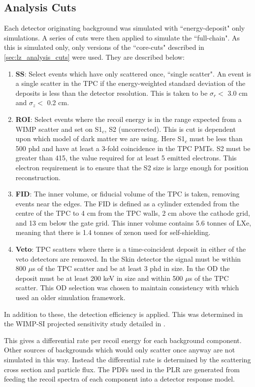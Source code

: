 

\subsection{Analysis Cuts}
\par
Each detector originating background was simulated with ``energy-deposit" only simulations.
A series of cuts were then applied to simulate the ``full-chain".
As this is simulated only, only versions of the ``core-cuts" described in \autoref{sec:lz_analysis_cuts} were used.
They are described below:

\begin{enumerate}
    \item \textbf{SS}: Select events which have only scattered once, ``single scatter". An event is a single scatter in the TPC if the energy-weighted standard deviation of the deposits is less than the detector resolution. This is taken to be $\sigma_r <$ 3.0 cm and $\sigma_z <$ 0.2 cm.
    \item \textbf{ROI}: Select events where the recoil energy is in the range expected from a WIMP scatter and set on S1$_c$, S2 (uncorrected). This is cut is dependent upon which model of dark matter we are using. Here S1$_c$ must be less than 500 phd and have at least a 3-fold coincidence in the TPC PMTs. S2 must be greater than 415, the value required for at least 5 emitted electrons. This electron requirement is to ensure that the S2 size is large enough for position reconstruction.
    \item \textbf{FID}: The inner volume, or fiducial volume of the TPC is taken, removing events near the edges. The FID is defined as a cylinder extended from the centre of the TPC to 4 cm from the TPC walls, 2 cm above the cathode grid, and 13 cm below the gate grid. This inner volume contains 5.6 tonnes of LXe, meaning that there is 1.4 tonnes of xenon used for self-shielding.
    \item \textbf{Veto}: TPC scatters where there is a time-coincident deposit in either of the veto detectors are removed. In the Skin detector the signal must be within 800 $\mu$s of the TPC scatter and be at least 3 phd in size. In the OD the deposit must be at least 200 keV in size and within 500 $\mu$s of the TPC scatter. This OD selection was chosen to maintain consistency with \cite{LZ_projected_sensitivity_paper_ref} which used an older simulation framework.
\end{enumerate}
In addition to these, the detection efficiency is applied.
This was determined in the WIMP-SI projected sensitivity study detailed in \cite{LZ_projected_sensitivity_paper_ref}.
\par
This gives a differential rate per recoil energy for each background component.
Other sources of backgrounds which would only scatter once anyway are not simulated in this way.
Instead the differential rate is determined by the scattering cross section and particle flux.
The PDFs used in the PLR are generated from feeding the recoil spectra of each component into a detector response model.

